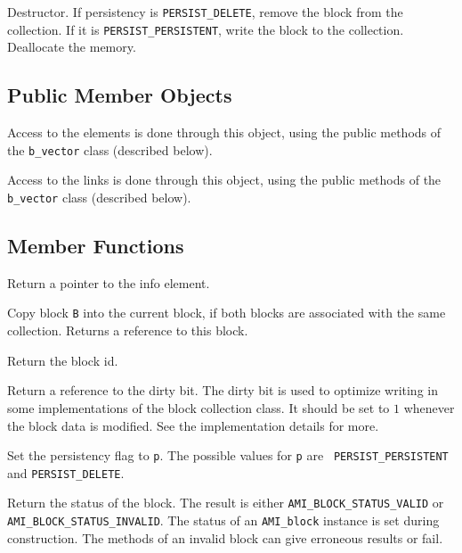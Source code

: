 	 {Destructor. If persistency 
	is {\tt PERSIST\_DELETE}, remove the block from the collection. 
	If it is {\tt PERSIST\_PERSISTENT}, write the block to the 
	collection. Deallocate the memory.}

   \etabb

\subsection{Public Member Objects}

   \btabb

	 {Access to the elements is done through
	this object, using the public methods of the {\tt b\_vector} class
	(described below).}

	 {Access to the links is done
	through this object, using the public methods of the {\tt
	b\_vector} class (described below).}

   \etabb

\subsection{Member Functions}

   \btabb
	
	 {Return a pointer to the info element.}

	 {Copy
	block {\tt B} into the current block, if both blocks are associated
	with the same collection. Returns a reference to this block.}

	 {Return the block id.}

	 {Return a reference to the dirty bit. The
	dirty bit is used to optimize writing in some implementations of
	the block collection class. It should be set to $1$ whenever the
	block data is modified. See the implementation details for more.}

	 {Set the persistency flag to
	{\tt p}. The possible values for {\tt p} are {\tt
	PERSIST\_PERSISTENT} and {\tt PERSIST\_DELETE}.}

	 {Return the status of the
	block. The result is either {\tt AMI\_BLOCK\_STATUS\_VALID} or {\tt
	AMI\_BLOCK\_STATUS\_INVALID}. The status of an {\tt AMI\_block}
	instance is set during construction. The methods of an invalid
	block can give erroneous results or fail.}

